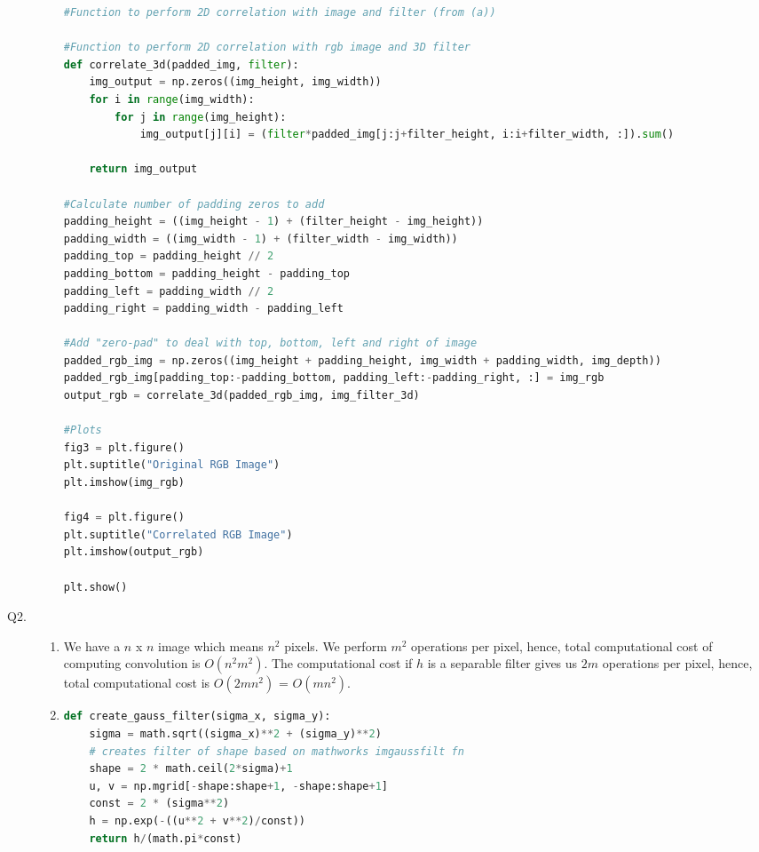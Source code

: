 \documentclass{csc_assignment4}
\begin{document}
\begin{description}
\begin{enumerate}[label=(\alph*)]
\begin{lstlisting}[language=Python]
#Function to perform 2D correlation with image and filter (from (a))

#Function to perform 2D correlation with rgb image and 3D filter
def correlate_3d(padded_img, filter):
	img_output = np.zeros((img_height, img_width))
	for i in range(img_width):
		for j in range(img_height):
			img_output[j][i] = (filter*padded_img[j:j+filter_height, i:i+filter_width, :]).sum()

	return img_output

#Calculate number of padding zeros to add
padding_height = ((img_height - 1) + (filter_height - img_height)) 
padding_width = ((img_width - 1) + (filter_width - img_width))
padding_top = padding_height // 2
padding_bottom = padding_height - padding_top
padding_left = padding_width // 2
padding_right = padding_width - padding_left

#Add "zero-pad" to deal with top, bottom, left and right of image
padded_rgb_img = np.zeros((img_height + padding_height, img_width + padding_width, img_depth))
padded_rgb_img[padding_top:-padding_bottom, padding_left:-padding_right, :] = img_rgb
output_rgb = correlate_3d(padded_rgb_img, img_filter_3d)

#Plots
fig3 = plt.figure()
plt.suptitle("Original RGB Image")
plt.imshow(img_rgb)

fig4 = plt.figure()
plt.suptitle("Correlated RGB Image")
plt.imshow(output_rgb)

plt.show()
\end{lstlisting}
\end{enumerate}

\item[Q2.]
\begin{enumerate}[label=(\alph*)]
\item We have a $n$ x $n$ image which means $n^{2}$ pixels. We perform $m^{2}$ operations per pixel, hence, total computational cost of computing convolution is $O(n^{2}m^{2})$. The computational cost if $h$ is a separable filter gives us $2m$ operations per pixel, hence, total computational cost is $O(2mn^{2})$ = $O(mn^{2})$.

\item
\begin{lstlisting}[language=Python]
def create_gauss_filter(sigma_x, sigma_y):
	sigma = math.sqrt((sigma_x)**2 + (sigma_y)**2)
	# creates filter of shape based on mathworks imgaussfilt fn
	shape = 2 * math.ceil(2*sigma)+1
	u, v = np.mgrid[-shape:shape+1, -shape:shape+1]
	const = 2 * (sigma**2)
	h = np.exp(-((u**2 + v**2)/const))
	return h/(math.pi*const)
\end{lstlisting}


\end{enumerate}
\end{description}
\end{document}
